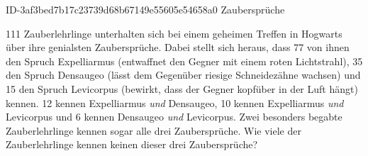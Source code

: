 \begin{exercise}
      {ID-3af3bed7b17c23739d68b67149e55605e54658a0}
      {Zaubersprüche}
  \ifproblem\problem\par
    111 Zauberlehrlinge unterhalten sich bei einem geheimen Treffen in
    Hogwarts über ihre genialsten Zaubersprüche. Dabei stellt sich heraus,
    dass 77 von ihnen den Spruch \glqq Expelliarmus\grqq{} (entwaffnet den
    Gegner mit einem roten Lichtstrahl), 35 den Spruch \glqq Densaugeo\grqq{}
    (lässt dem Gegenüber riesige Schneidezähne wachsen) und 15 den Spruch
    \glqq Levicorpus\grqq{} (bewirkt, dass der Gegner kopfüber in der Luft
    hängt) kennen. 12 kennen \glqq Expelliarmus\grqq{} \emph{und} \glqq
    Densaugeo\grqq{}, 10 kennen \glqq Expelliarmus\grqq{} \emph{und} \glqq
    Levicorpus\grqq{} und 6 kennen \glqq Densaugeo\grqq{} \emph{und} \glqq
    Levicorpus\grqq. Zwei besonders begabte Zauberlehrlinge kennen sogar
    alle drei Zaubersprüche. Wie viele der Zauberlehrlinge kennen keinen
    dieser drei Zaubersprüche?
  \fi
\end{exercise}
